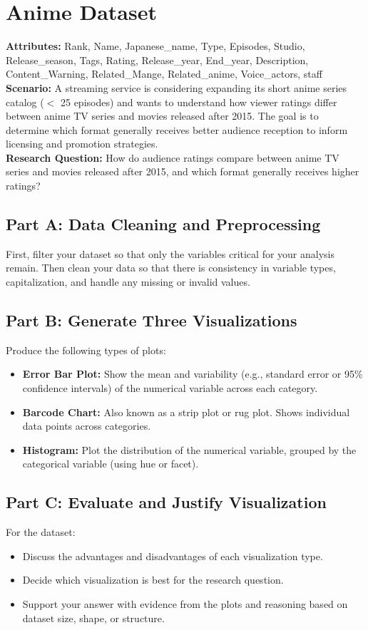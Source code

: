 \section{Anime Dataset}

{\bf Attributes:} Rank, Name, Japanese\_name, Type, Episodes, Studio, Release\_season, Tags, Rating, Release\_year, End\_year, Description, Content\_Warning, Related\_Mange, Related\_anime, Voice\_actors, staff\\

{\bf Scenario:}  A streaming service is considering expanding its short anime series catalog ($<$ 25 episodes) and wants to understand how viewer ratings differ between anime TV series and movies released after 2015. The goal is to determine which format generally receives better audience reception to inform licensing and promotion strategies.\\

{\bf Research Question:} How do audience ratings compare between anime TV series and movies released after 2015, and which format generally receives higher ratings?

\subsection{Part A: Data Cleaning and Preprocessing}
First, filter your dataset so that only the variables critical for your analysis remain. Then clean your data so that there is consistency in variable types, capitalization, and handle any missing or invalid values.

\subsection{Part B: Generate Three Visualizations}
Produce the following types of plots:
\begin{itemize}
    \item \textbf{Error Bar Plot:} Show the mean and variability (e.g., standard error or 95\% confidence intervals) of the numerical variable across each category.
    \item \textbf{Barcode Chart:} Also known as a strip plot or rug plot. Shows individual data points across categories.
    \item \textbf{Histogram:} Plot the distribution of the numerical variable, grouped by the categorical variable (using hue or facet).
\end{itemize}

\subsection{Part C: Evaluate and Justify Visualization}
For the dataset:
\begin{itemize}
    \item Discuss the advantages and disadvantages of each visualization type.
    \item Decide which visualization is best for the research question.
    \item Support your answer with evidence from the plots and reasoning based on dataset size, shape, or structure.
\end{itemize}
